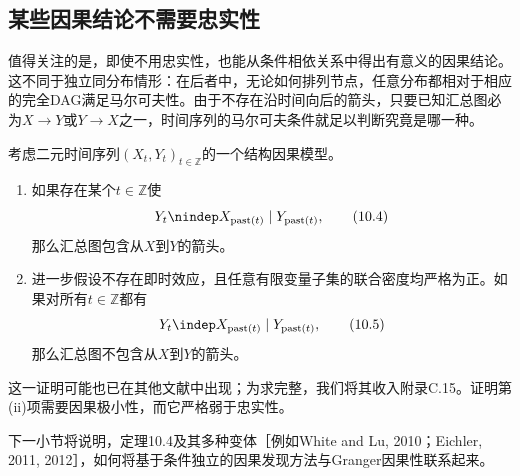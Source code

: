 \subsection{某些因果结论不需要忠实性}
值得关注的是，即使不用忠实性，也能从条件相依关系中得出有意义的因果结论。这不同于独立同分布情形：在后者中，无论如何排列节点，任意分布都相对于相应的完全DAG满足马尔可夫性。由于不存在沿时间向后的箭头，只要已知汇总图必为$X\to Y$或$Y\to X$之一，时间序列的马尔可夫条件就足以判断究竟是哪一种。

\Needspace{4cm}
\begin{theorem}[检测箭头$X\to Y$]
考虑二元时间序列$(X_t,Y_t)_{t\in\mathbb Z}$的一个结构因果模型。
\begin{enumerate}[label=(\roman*)]
 \item 如果存在某个$t\in\mathbb Z$使
 \begin{equation}
 Y_t\nindep X_{\mathrm{past}(t)}\mid Y_{\mathrm{past}(t)},
 \tag{10.4}
 \end{equation}
 那么汇总图包含从$X$到$Y$的箭头。
 \item 进一步假设不存在即时效应，且任意有限变量子集的联合密度均严格为正。如果对所有$t\in\mathbb Z$都有
 \begin{equation}
 Y_t\indep X_{\mathrm{past}(t)}\mid Y_{\mathrm{past}(t)},
 \tag{10.5}
 \end{equation}
 那么汇总图不包含从$X$到$Y$的箭头。
\end{enumerate}
\end{theorem}

这一证明可能也已在其他文献中出现；为求完整，我们将其收入附录C.15。证明第(ii)项需要因果极小性，而它严格弱于忠实性。

下一小节将说明，定理10.4及其多种变体［例如White and Lu, 2010；Eichler, 2011, 2012］，如何将基于条件独立的因果发现方法与Granger因果性联系起来。
\FloatBarrier
